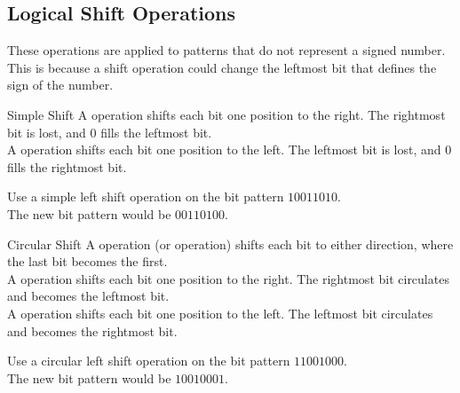 \documentclass[../notes.tex]{subfiles}
\begin{document}
			\subsection{Logical Shift Operations}
				These operations are applied to patterns that do not represent a signed number. This is because a shift operation could change the leftmost bit that defines the sign of the number.
				\begin{definition}{Simple Shift}
					A  operation shifts each bit one position to the right. The rightmost bit is lost, and $0$ fills the leftmost bit.\\[12pt]
					A  operation shifts each bit one position to the left. The leftmost bit is lost, and $0$ fills the rightmost bit.
					\begin{example}
						Use a simple left shift operation on the bit pattern $10011010$.\\
						The new bit pattern would be $00110100$.
					\end{example}
				\end{definition}
				\begin{definition}{Circular Shift}
					A  operation (or  operation) shifts each bit to either direction, where the last bit becomes the first.\\[12pt]
					A  operation shifts each bit one position to the right. The rightmost bit circulates and becomes the leftmost bit.\\[12pt]
					A  operation shifts each bit one position to the left. The leftmost bit circulates and becomes the rightmost bit.
					\begin{example}
						Use a circular left shift operation on the bit pattern $11001000$.\\
						The new bit pattern would be $10010001$.
					\end{example}
				\end{definition}
			\pagebreak
\end{document}
